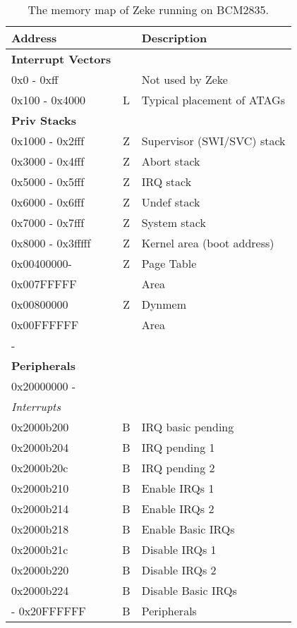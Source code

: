\begin{table}
\caption{The memory map of Zeke running on BCM2835.}
\label{table:bcm_memmap}
\begin{tabular}{l|c|l}
Address                     &   & Description                   \\
\hline
\textbf{Interrupt Vectors}  &   &                               \\
0x0 - 0xff                  &   & Not used by Zeke              \\
0x100  - 0x4000             & L & Typical placement of ATAGs    \\
\textbf{Priv Stacks}        &   &                               \\
0x1000 - 0x2fff             & Z & Supervisor (SWI/SVC) stack    \\
0x3000 - 0x4fff             & Z & Abort stack                   \\
0x5000 - 0x5fff             & Z & IRQ stack                     \\
0x6000 - 0x6fff             & Z & Undef stack                   \\
0x7000 - 0x7fff             & Z & System stack                  \\
0x8000 - 0x3fffff           & Z & Kernel area (boot address)    \\
0x00400000-                 & Z & Page Table                    \\
0x007FFFFF                  &   & Area                          \\
0x00800000                  & Z & Dynmem                        \\
0x00FFFFFF                  &   & Area                          \\
-                           &   &                               \\
\textbf{Peripherals}        &   &                               \\
0x20000000 -                &   &                               \\
\textit{Interrupts}         &   &                               \\
0x2000b200                  & B & IRQ basic pending             \\
0x2000b204                  & B & IRQ pending 1                 \\
0x2000b20c                  & B & IRQ pending 2                 \\
0x2000b210                  & B & Enable IRQs 1                 \\
0x2000b214                  & B & Enable IRQs 2                 \\
0x2000b218                  & B & Enable Basic IRQs             \\
0x2000b21c                  & B & Disable IRQs 1                \\
0x2000b220                  & B & Disable IRQs 2                \\
0x2000b224                  & B & Disable Basic IRQs            \\
- 0x20FFFFFF                & B & Peripherals
\end{tabular}


\end{table}
